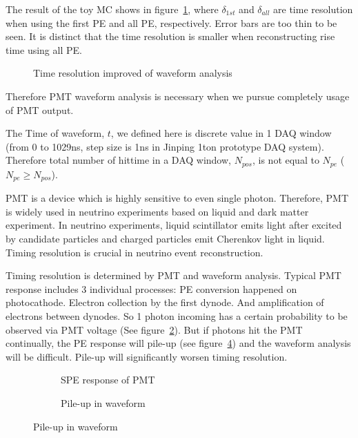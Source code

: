 The result of the toy MC shows in figure~\ref{fig:reso-diff}, where $\delta_{1st}$ and $\delta_{all}$ are time resolution when using the first PE and all PE, respectively. Error bars are too thin to be seen. It is distinct that the time resolution is smaller when reconstructing rise time using all PE. 

\begin{figure}[H]
    \centering
    \scalebox{0.35}{}
    \caption{\label{fig:reso-diff} Time resolution improved of waveform analysis}
\end{figure}

Therefore PMT waveform analysis is necessary when we pursue completely usage of PMT output. 

The Time of waveform, $t$, we defined here is discrete value in 1 DAQ window (from 0 to 1029ns, step size is 1ns in Jinping 1ton prototype DAQ system). Therefore total number of hittime in a DAQ window, $N_{pos}$, is not equal to $N_{pe}$ ($N_{pe} \geq N_{pos}$). 

PMT is a device which is highly sensitive to even single photon. Therefore, PMT is widely used in neutrino experiments based on liquid and dark matter experiment. In neutrino experiments, liquid scintillator emits light after excited by candidate particles and charged particles emit Cherenkov light in liquid. Timing resolution is crucial in neutrino event reconstruction. 

Timing resolution is determined by PMT and waveform analysis. Typical PMT response includes 3 individual processes: PE conversion happened on photocathode. Electron collection by the first dynode. And amplification of electrons between dynodes. So 1 photon incoming has a certain probability to be observed via PMT voltage (See figure~\ref{fig:spe}). But if photons hit the PMT continually, the PE response will pile-up (see figure~\ref{fig:pile}) and the waveform analysis will be difficult. Pile-up will significantly worsen timing resolution. 

\begin{figure}[H]
\begin{minipage}[b]{.5\textwidth}
\begin{figure}[H]
    \centering
    \resizebox{\textwidth}{!}{}
    \caption{\label{fig:spe} SPE response of PMT}
\end{figure}
\end{minipage}
\begin{minipage}[b]{.5\textwidth}
\begin{figure}[H]
    \centering
    \resizebox{\textwidth}{!}{}
    \caption{\label{fig:pile} Pile-up in waveform}
\end{figure}
\end{minipage}
\end{figure}


